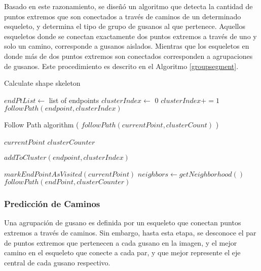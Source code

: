 Basado en este razonamiento, se dise\~n\'o un algoritmo que detecta la cantidad de
puntos extremos que son conectados a trav\'es de caminos de un determinado esqueleto,
y determina el tipo de grupo de gusanos al que pertenece. Aquellos esqueletos donde
se conectan exactamente dos puntos extremos a trav\'es de uno y solo un camino, corresponde
a gusanos aislados. Mientras que los esqueletos en donde m\'as de dos puntos extremos son
conectados corresponden a agrupaciones de gusanos.
Este procedimiento es descrito en el Algoritmo \ref{groupsegment}. 

\begin{algorithm}[h]                     
\caption{Calculate shape skeleton}         
\label{groupsegment}                    
\begin{algorithmic}                   

\STATE $endPtList \leftarrow$ list of endpoints
\STATE $clusterIndex \leftarrow$ 0
\STATE {}
\ELSE
\STATE $clusterIndex +=1$
\STATE $followPath(endpoint,clusterIndex)$
\ENDIF
\ENDFOR
\end{algorithmic}
\end{algorithm}

\begin{algorithm}[h]                     
\caption{Follow Path algorithm ( $followPath(currentPoint,clusterCount)$ )}         
\begin{algorithmic}                   

\REQUIRE $currentPoint$
\REQUIRE $clusterCounter$

\RETURN 
\ELSE
\STATE $addToCluster(endpoint,clusterIndex)$
\ENDIF

\STATE {}
\STATE $markEndPointAsVisited(currentPoint)$
\ENDIF
\STATE $neighbors \leftarrow getNeighborhood()$
\STATE $followPath(endPoint,clusterCounter)$
\ENDFOR

\end{algorithmic}
\end{algorithm}


\subsubsection*{Predicci\'on de Caminos}
\label{sec:pathguessing}

Una agrupaci\'on de gusano es definida por un esqueleto
que conectan puntos extremos a trav\'es de caminos. Sin embargo, hasta esta etapa,
se desconoce el par de puntos extremos que pertenecen a cada gusano en la imagen, y 
el mejor camino en el esqueleto
que conecte a cada par, y que mejor represente el eje central de cada gusano 
respectivo.\\

